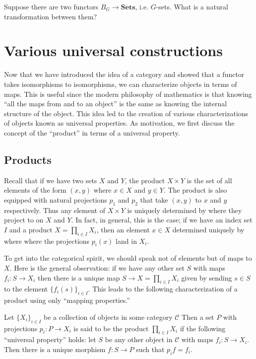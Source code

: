\begin{exercise}
 Suppose there are  two functors $B_G \to
\mathbf{Sets}$, i.e. $G$-sets. What is a natural transformation between them?
\end{exercise}


\section{Various universal constructions}

Now that we have introduced the idea of a category and showed that a functor
takes isomorphisms to isomorphisms, we can characterize objects in terms of
maps. This is useful since the modern philosophy of mathematics is that knowing
``all the maps from and to an object'' is the same as knowing the internal
structure of the object. This idea led to the creation of various
characterizations of objects known as universal properties.
As motivation, we first discuss the concept of the ``product'' in terms of a
universal property.

\subsection{Products}
Recall that if we have two sets $X$ and $Y$, the product $X\times Y$ is the set
of all elements of the form $(x,y)$ where $x\in X$ and $y\in Y$. The product is
also equipped with natural projections $p_1$ and $p_2$ that take $(x,y)$ to $x$
and $y$ respectively. Thus any element of $X\times Y$ is uniquely determined by
where they project to on $X$ and $Y$. In fact, in general, this is the case; if
we have an index set $I$ and a product $X=\prod_{i\in I} X_i$, then an element
$x\in X$ determined uniquely by where where the projections $p_i(x)$ land in
$X_i$. 

To get into the categorical spirit, we should speak not of elements but of maps
to $X$. Here is the general observation: if we have any other set $S$ with maps
$f_i:S\rightarrow X_i$ then there is a unique map $S\rightarrow X=\prod_{i\in
I}X_i$ given by sending $s\in S$ to the element $\{ f_i(s)\}_{i\in I}$. This
leads to the following characterization of a product using only ``mapping
properties.''

\begin{definition} Let $\{X_i\}_{i\in I}$ be a collection of objects in some
category $\mathcal{C}$ Then a set $P$ with projections $p_i: P\rightarrow X_i$
is said to be the product $\prod_{i\in I} X_i$ if the following ``universal
property'' holds:
let $S$ be any other object in $\mathcal{C}$ with maps $f_i:S\rightarrow X_i$.
Then there is a unique morphism $f:S\rightarrow P$ such that $p_i f = f_i$.
\end{definition}

